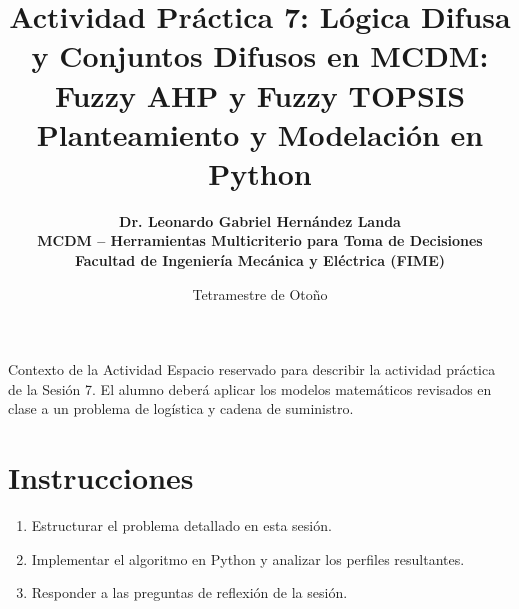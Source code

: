 \documentclass[11pt,a4paper]{article}
\title{%
  \sffamily\bfseries\color{UANLblue}%
  Actividad Práctica 7: Lógica Difusa y Conjuntos Difusos en MCDM: Fuzzy AHP y Fuzzy TOPSIS\\
  \large Planteamiento y Modelación en Python
}
\author{%
  \sffamily\bfseries\color{FIMEdarkgray}%
  Dr. Leonardo Gabriel Hernández Landa\\
  \small MCDM -- Herramientas Multicriterio para Toma de Decisiones\\
  \small\color{FIMEgreen}Facultad de Ingeniería Mecánica y Eléctrica (FIME)
}
\date{\sffamily Tetramestre de Otoño}
\begin{document}
\maketitle
\thispagestyle{fancy}

\begin{brandbox}{Contexto de la Actividad}
  Espacio reservado para describir la actividad práctica de la Sesión 7. El alumno deberá aplicar los modelos matemáticos revisados en clase a un problema de logística y cadena de suministro.
\end{brandbox}

\section{Instrucciones}
\begin{enumerate}
    \item Estructurar el problema detallado en esta sesión.
    \item Implementar el algoritmo en Python y analizar los perfiles resultantes.
    \item Responder a las preguntas de reflexión de la sesión.
\end{enumerate}
\end{document}
